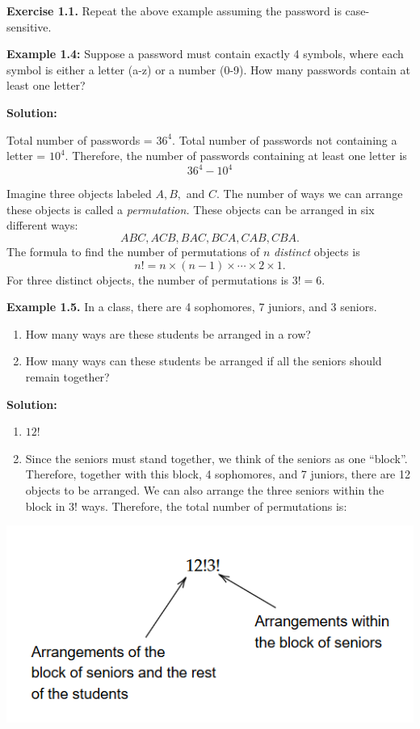 \documentclass[
  12pt,
]{krantzNoCorner}
\providecommand{\tightlist}{%
  \setlength{\itemsep}{0pt}\setlength{\parskip}{0pt}}
\begin{document}
\textbf{Exercise 1.1.} Repeat the above example assuming the password is
case-sensitive.

\textbf{Example 1.4:} Suppose a password must contain exactly 4 symbols,
where each symbol is either a letter (a-z) or a number (0-9). How many
passwords contain at least one letter?

\textbf{Solution:}

Total number of passwords = \(36^4\). Total number of passwords not
containing a letter = \(10^4\). Therefore, the number of passwords
containing at least one letter is \[36^4-10^4\]

Imagine three objects labeled \(A,B,\) and \(C.\) The number of ways we can
arrange these objects is called a \emph{permutation.} These objects can be
arranged in six different ways: \[ABC, ACB, BAC, BCA, CAB, CBA.\] The
formula to find the number of permutations of \(n\) \emph{distinct} objects is
\[n!=n\times (n-1)\times\cdots\times 2\times 1.\] For three distinct
objects, the number of permutations is \(3!=6.\)

\textbf{Example 1.5.} In a class, there are 4 sophomores, 7 juniors, and 3
seniors.

\begin{enumerate}
\def\labelenumi{\arabic{enumi}.}
\tightlist
\item
  How many ways are these students be arranged in a row?
\item
  How many ways can these students be arranged if all the seniors
  should remain together?
\end{enumerate}

\textbf{Solution:}

\begin{enumerate}
\def\labelenumi{\arabic{enumi}.}
\tightlist
\item
  \(12!\)
\item
  Since the seniors must stand together, we think of the seniors as
  one ``block''. Therefore, together with this block, 4 sophomores,
  and 7 juniors, there are 12 objects to be arranged. We can also
  arrange the three seniors within the block in \(3!\) ways. Therefore,
  the total number of permutations is:
\end{enumerate}

\includegraphics[width=0.8\linewidth,height=0.5\textheight]{class_example_permutations}
\end{document}
